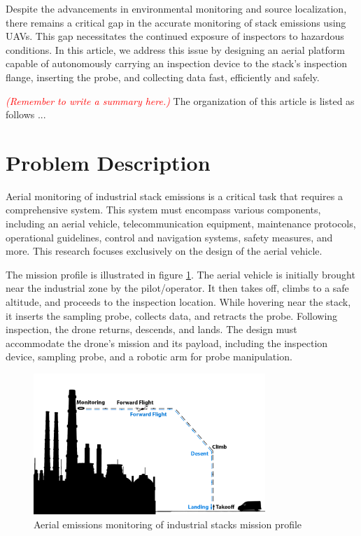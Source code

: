 \documentclass[lettersize,journal]{IEEEtran}
\begin{document}
Despite the advancements in environmental monitoring and source localization, there remains a critical gap in the accurate monitoring of stack emissions using UAVs. This gap necessitates the continued exposure of inspectors to hazardous conditions. In this article, we address this issue by designing an aerial platform capable of autonomously carrying an inspection device to the stack's inspection flange, inserting the probe, and collecting data fast, efficiently and safely.

\textcolor{red}{\emph{(Remember to write a summary here.)}} The organization of this article is listed as follows ...

\section{Problem Description}
Aerial monitoring of industrial stack emissions is a critical task that requires a comprehensive system. This system must encompass various components, including an aerial vehicle, telecommunication equipment, maintenance protocols, operational guidelines, control and navigation systems, safety measures, and more. This research focuses exclusively on the design of the aerial vehicle.

The mission profile is illustrated in figure \ref{fig.mission}. The aerial vehicle is initially brought near the industrial zone by the pilot/operator. It then takes off, climbs to a safe altitude, and proceeds to the inspection location. While hovering near the stack, it inserts the sampling probe, collects data, and retracts the probe. Following inspection, the drone returns, descends, and lands. The design must accommodate the drone's mission and its payload, including the inspection device, sampling probe, and a robotic arm for probe manipulation.

\begin{figure}[!t]
\centering
\includegraphics[width=3.45in]{./Pictures/MissionDiagram}
\caption{Aerial emissions monitoring of industrial stacks mission profile}
\label{fig.mission}
\end{figure}
\end{document}
